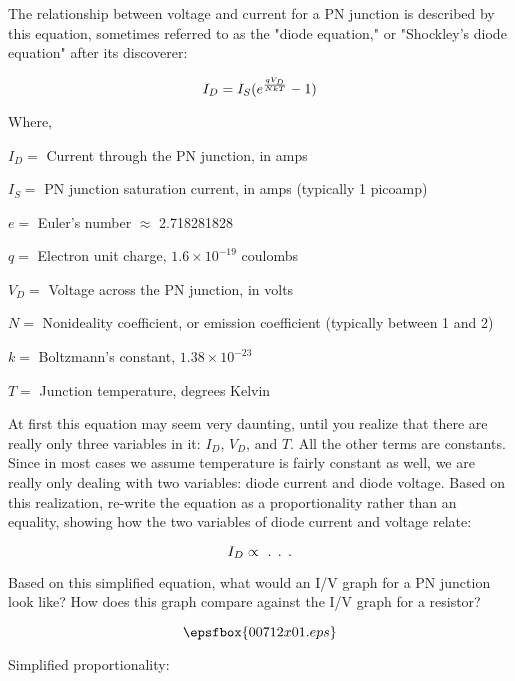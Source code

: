 

The relationship between voltage and current for a PN junction is described by this equation, sometimes referred to as the "diode equation," or "Shockley's diode equation" after its discoverer:

$$I_D = I_S (e^{qV_D \over NkT} - 1)$$

\noindent
Where,

$I_D =$ Current through the PN junction, in amps

$I_S =$ PN junction saturation current, in amps (typically 1 picoamp)

$e =$ Euler's number $\approx$ 2.718281828

$q =$ Electron unit charge, $1.6 \times 10^{-19}$ coulombs

$V_D =$ Voltage across the PN junction, in volts

$N =$ Nonideality coefficient, or emission coefficient (typically between 1 and 2)

$k =$ Boltzmann's constant, $1.38 \times 10^{-23}$

$T =$ Junction temperature, degrees Kelvin

\vskip 10pt

At first this equation may seem very daunting, until you realize that there are really only three variables in it: $I_D$, $V_D$, and $T$.  All the other terms are constants.  Since in most cases we assume temperature is fairly constant as well, we are really only dealing with two variables: diode current and diode voltage.  Based on this realization, re-write the equation as a proportionality rather than an equality, showing how the two variables of diode current and voltage relate:

$$I_D \propto \hbox{ . . .}$$

\vskip 10pt

Based on this simplified equation, what would an I/V graph for a PN junction look like?  How does this graph compare against the I/V graph for a resistor?

$$\epsfbox{00712x01.eps}$$







Simplified proportionality:

